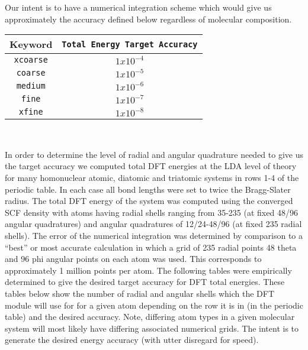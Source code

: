 Our intent is to have a numerical integration scheme which would give
us approximately the accuracy defined below regardless of molecular
composition.  
\begin{center}
  \begin{tabular}[right]{|c|c|} \hline
Keyword & {\tt Total Energy Target Accuracy} \\ \hline
{\tt xcoarse} & $1x10^{-4}$ \\ \hline
{\tt coarse}  & $1x10^{-5}$ \\ \hline
{\tt medium}  & $1x10^{-6}$ \\ \hline
{\tt fine}    & $1x10^{-7}$ \\ \hline
{\tt xfine}   & $1x10^{-8}$ \\ \hline
  \end{tabular} \\
\end{center}

In order to determine the level of radial and angular quadrature needed
to give us the target accuracy we computed total DFT energies 
at the LDA level of theory for many
homonuclear atomic, diatomic and triatomic systems in rows 1-4 of the
periodic table.  In each case all bond lengths were set to twice the
Bragg-Slater radius.  The total DFT energy of the system was computed
using the converged SCF density with atoms having radial shells
ranging from 35-235 (at fixed 48/96 angular quadratures) and angular
quadratures of 12/24-48/96 (at fixed 235 radial shells).  The error of
the numerical integration was determined by comparison to a ``best''
or most accurate calculation in which a grid of 235 radial points 48
theta and 96 phi angular points on each atom was used.  This
corresponds to approximately 1 million points per atom.  The following
tables were empirically determined to give the desired target accuracy
for DFT total energies.  These tables below show the number of radial and
angular shells which the DFT module will use for for a given atom
depending on the row it is in (in the periodic table) and the desired
accuracy.  Note, differing atom types in a given molecular system will
most likely have differing associated numerical grids.  The intent is
to generate the desired energy accuracy (with utter disregard for speed).

